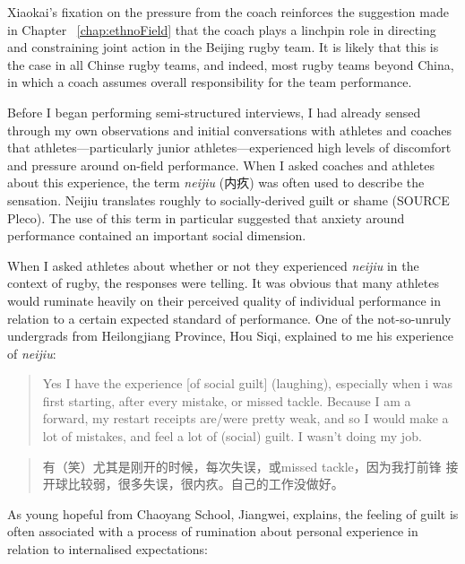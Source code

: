 \begin{CJK}{UTF8}{gbsn}
Xiaokai's fixation on the pressure from the coach reinforces the suggestion made in Chapter ~\ref{chap:ethnoField} that the coach plays a linchpin role in directing and constraining joint action in the Beijing rugby team.  It is likely that this is the case in all Chinse rugby teams, and indeed, most rugby teams beyond China, in which a coach assumes overall responsibility for the team performance.



Before I began performing semi-structured interviews, I had already sensed through my own observations and initial conversations with athletes and coaches that athletes---particularly junior athletes---experienced high levels of discomfort and pressure around on-field performance. When I asked coaches and athletes about this experience, the term \textit{neijiu} (内疚) was often used to describe the sensation.  Neijiu translates roughly to socially-derived guilt or shame (SOURCE Pleco).  The use of this term in particular suggested that anxiety around performance contained an important social dimension.

When I asked athletes about whether or not they experienced \textit{neijiu} in the context of rugby, the responses were telling.  It was obvious that many athletes would ruminate heavily on their perceived quality of individual performance in relation to a certain expected standard of performance.  One of the not-so-unruly undergrads from Heilongjiang Province, Hou Siqi, explained to me his experience of \textit{neijiu}:

      \begin{quotation}
        Yes I have the experience [of social guilt] (laughing), especially when i was first starting, after every mistake, or missed tackle.  Because I am a forward, my restart receipts are/were pretty weak, and so I would make a lot of mistakes, and feel a lot of (social) guilt.  I wasn't doing my job.
      \end{quotation}

      \begin{quotation}
        有（笑）尤其是刚开的时候，每次失误，或missed tackle，因为我打前锋 接开球比较弱，很多失误，很内疚。自己的工作没做好。 
      \end{quotation}

As young hopeful from Chaoyang School, Jiangwei, explains, the feeling of guilt is often associated with a process of rumination about personal experience in relation to internalised expectations:


\end{CJK}
